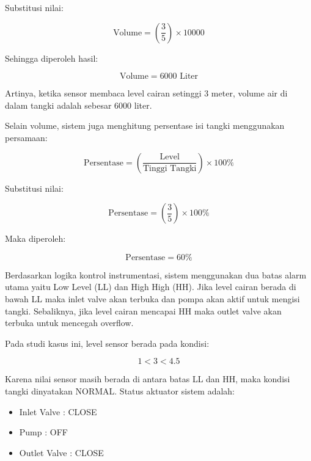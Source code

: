 \documentclass[12pt,a4paper]{article}
\begin{document}
Substitusi nilai:

\begin{equation}
\text{Volume} = \left( \frac{3}{5} \right) \times 10000
\end{equation}

Sehingga diperoleh hasil:

\begin{equation}
\text{Volume} = 6000 \text{ Liter}
\end{equation}

Artinya, ketika sensor membaca level cairan setinggi 3 meter, volume air di dalam tangki adalah sebesar 6000 liter.

Selain volume, sistem juga menghitung persentase isi tangki menggunakan persamaan:

\begin{equation}
\text{Persentase} = \left( \frac{\text{Level}}{\text{Tinggi Tangki}} \right) \times 100\%
\end{equation}

Substitusi nilai:

\begin{equation}
\text{Persentase} = \left( \frac{3}{5} \right) \times 100\%
\end{equation}

Maka diperoleh:

\begin{equation}
\text{Persentase} = 60\%
\end{equation}

Berdasarkan logika kontrol instrumentasi, sistem menggunakan dua batas alarm utama yaitu Low Level (LL) dan High High (HH). Jika level cairan berada di bawah LL maka inlet valve akan terbuka dan pompa akan aktif untuk mengisi tangki. Sebaliknya, jika level cairan mencapai HH maka outlet valve akan terbuka untuk mencegah overflow.

Pada studi kasus ini, level sensor berada pada kondisi:

\begin{equation}
1 < 3 < 4.5
\end{equation}

Karena nilai sensor masih berada di antara batas LL dan HH, maka kondisi tangki dinyatakan NORMAL. Status aktuator sistem adalah:

\begin{itemize}
    \item Inlet Valve : CLOSE
    \item Pump : OFF
    \item Outlet Valve : CLOSE
\end{itemize}
\end{document}
